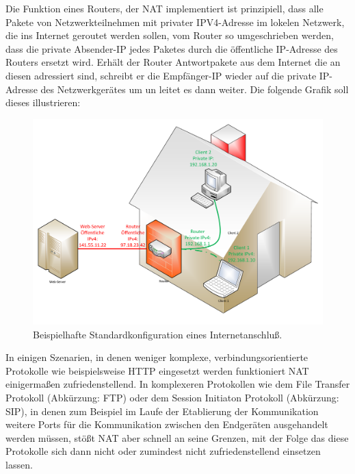 \documentclass[a4paper,12pt]{scrartcl}
\begin{document}
Die Funktion eines Routers, der NAT implementiert ist prinzipiell, dass alle Pakete von Netzwerkteilnehmen mit privater IPV4-Adresse im lokelen Netzwerk, die ins Internet geroutet werden sollen, vom Router so umgeschrieben werden, dass die private Absender-IP jedes Paketes durch die \"offentliche IP-Adresse des Routers ersetzt wird. Erh\"alt der Router Antwortpakete aus dem Internet die an diesen adressiert sind, schreibt er die Empf\"anger-IP wieder auf die private IP-Adresse des Netzwerkger\"ates um un leitet es dann weiter. Die folgende Grafik soll dieses illustrieren:

\begin{figure}[htb]
\begin{center}
 \includegraphics[width=1\hsize]{./Zeichnungen/IPv4NAT.pdf}
 \end{center}
\caption[Beispielhafte Standardkonfiguration eines Internetanschlu\ss{} mit NAT, Quelle: Autor, verwendete Symbole unterliegen der
GPL]{\label{stdinet}Beispielhafte Standardkonfiguration eines Internetanschlu\ss{}.}
\end{figure}

In einigen Szenarien, in denen weniger komplexe, verbindungsorientierte Protokolle wie beispielsweise HTTP eingesetzt werden funktioniert NAT einigerma\ss{}en zufriedenstellend. In komplexeren Protokollen wie dem File Transfer Protokoll (Abk\"urzung: FTP) oder dem Session Initiaton Protokoll (Abk\"urzung: SIP), in denen zum Beispiel im Laufe der Etablierung der Kommunikation weitere Ports f\"ur die Kommunikation zwischen den Endger\"aten ausgehandelt werden m\"ussen, st\"o\ss{}t NAT aber schnell an seine Grenzen, mit der Folge das diese Protokolle sich dann nicht oder zumindest nicht zufriedenstellend einsetzen lassen.
\end{document}

